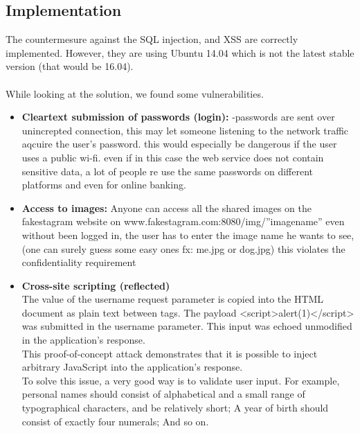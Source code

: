 \subsection{Implementation}
The countermesure against the SQL injection, and XSS are correctly implemented. However, they are using Ubuntu 14.04 which is not the latest stable version (that would be 16.04). \\ \\
While looking at the solution, we found some vulnerabilities. \\

\begin{itemize}  
\item \textbf{Cleartext submission of passwords (login):}
-passwords are sent over unincrepted connection, this may let someone listening to the network traffic aqcuire the user's password.
this would especially be dangerous if the user uses a public wi-fi.
even if in this case the web service does not contain sensitive data, a lot of people re use the same passwords on different platforms and even for online banking.

\item \textbf{Access to images:}
Anyone can access all the shared images on the fakestagram website on www.fakestagram.com:8080/img/''imagename'' even without been logged in, the user has to enter the image name he wants to see,(one can surely guess some easy ones fx: me.jpg or dog.jpg)
this violates the confidentiality requirement


\item \textbf{Cross-site scripting (reflected)} \\
The value of the username request parameter is copied into the HTML document as plain text between tags. The payload <script>alert(1)</script> was submitted in the username parameter. This input was echoed unmodified in the application's response. \\

This proof-of-concept attack demonstrates that it is possible to inject arbitrary JavaScript into the application's response. \\

To solve this issue, a very good way is to validate user input. For example, personal names should consist of alphabetical and a small range of typographical characters, and be relatively short; A year of birth should consist of exactly four numerals; And so on.


\end{itemize}
